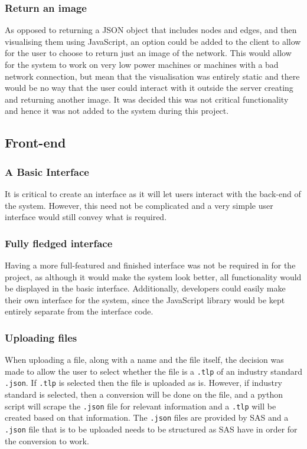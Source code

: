 \documentclass[../dissertation.tex]{subfiles}
\begin{document}
\subsubsection{Return an image}

As opposed to returning a JSON object that includes nodes and edges, and then visualising them using JavaScript, an option could be added to the client to allow for the user to choose to return just an image of the network. This would allow for the system to work on very low power machines or machines with a bad network connection, but mean that the visualisation was entirely static and there would be no way that the user could interact with it outside the server creating and returning another image. It was decided this was not critical functionality and hence it was not added to the system during this project.

\subsection{Front-end}

\subsubsection{A Basic Interface}

It is critical to create an interface as it will let users interact with the back-end of the system. However, this need not be complicated and a very simple user interface would still convey what is required.

\subsubsection{Fully fledged interface}

Having a more full-featured and finished interface was not be required in for the project, as although it would make the system look better, all functionality would be displayed in the basic interface. Additionally, developers could easily make their own interface for the system, since the JavaScript library would be kept entirely separate from the interface code.

\subsubsection{Uploading files}

When uploading a file, along with a name and the file itself, the decision was made to allow the user to select whether the file is a \texttt{.tlp} of an industry standard \texttt{.json}. If \texttt{.tlp} is selected then the file is uploaded as is. However, if industry standard is selected, then a conversion will be done on the file, and a python script will scrape the \texttt{.json} file for relevant information and a \texttt{.tlp} will be created based on that information. The \texttt{.json} files are provided by SAS and a \texttt{.json} file that is to be uploaded needs to be structured as SAS have in order for the conversion to work. 
\end{document}
